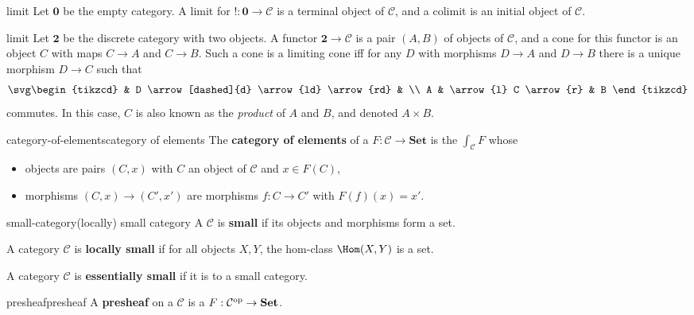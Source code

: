 \begin{example}{limit}
    Let $\textbf{0}$ be the empty category. A limit for $! : \textbf{0} \to \mathcal{C}$ is a terminal object of $\mathcal{C}$, and a colimit is an initial object of $\mathcal{C}$.
\end{example}

\begin{example}{limit}
    Let $\textbf{2}$ be the discrete category with two objects. A functor $\textbf{2} \to \mathcal{C}$ is a pair $(A, B)$ of objects of $\mathcal{C}$, and a cone for this functor is an object $C$ with maps $C \to A$ and $C \to B$. Such a cone is a limiting cone iff for any $D$ with morphisms $D \to A$ and $D \to B$ there is a unique morphism $D \to C$ such that
    \[ \svg \begin{tikzcd} & D \arrow[dashed]{d} \arrow{ld} \arrow{rd} & \\ A & \arrow{l} C \arrow{r} & B \end{tikzcd} \]
    commutes. In this case, $C$ is also known as the \textit{product} of $A$ and $B$, and denoted $A \times B$.
\end{example}

\begin{topic}{category-of-elements}{category of elements}
    The \textbf{category of elements} of a  $F : \mathcal{C} \to \textbf{Set}$ is the  $\int_\mathcal{C} F$ whose
    \begin{itemize}
        \item objects are pairs $(C, x)$ with $C$ an object of $\mathcal{C}$ and $x \in F(C)$,
        \item morphisms $(C, x) \to (C', x')$ are morphisms $f : C \to C'$ with $F(f)(x) = x'$.
    \end{itemize}
\end{topic}

\begin{topic}{small-category}{(locally) small category}
    A  $\mathcal{C}$ is \textbf{small} if its objects and morphisms form a set.
    
    A category $\mathcal{C}$ is \textbf{locally small} if for all objects $X, Y$, the hom-class $\Hom(X, Y)$ is a set.
    
    A category $\mathcal{C}$ is \textbf{essentially small} if it is  to a small category.
\end{topic}

\begin{topic}{presheaf}{presheaf}
    A \textbf{presheaf} on a  $\mathcal{C}$ is a  $F : \mathcal{C}^\textup{op} \to \textbf{Set}$.
\end{topic}

